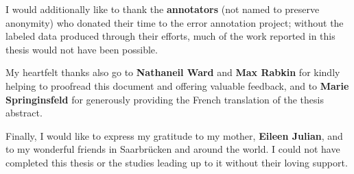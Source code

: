 I would additionally like to thank the \textbf{annotators} (not named to preserve anonymity) who donated their time to the error annotation project; without the labeled data produced through their efforts, much of the work reported in this thesis would not have been possible.

My heartfelt thanks also go to \textbf{Nathaneil Ward} and \textbf{Max Rabkin} for kindly helping to proofread this document and offering valuable feedback, and to \textbf{Marie Springinsfeld} for generously providing the French translation of the thesis abstract.

Finally, I would like to express my gratitude to 
my mother, \textbf{Eileen Julian}, and to {my wonderful friends} in Saarbrücken and around the world.
I could not have completed this thesis or the studies leading up to it without 
their loving support.